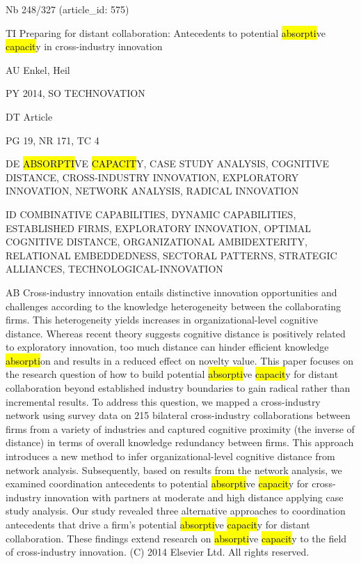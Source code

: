 \documentclass[a4paper]{article}
\begin{document}
\vspace*{-2cm}
Nb \tabto{0cm}248/327 (article\_id: 575)\par
TI \tabto{0cm}Preparing for distant collaboration: Antecedents to potential \hl{absorpti}ve \hl{capacit}y in cross-industry innovation\par
AU \tabto{0cm}Enkel, Heil\par
PY \tabto{0cm}2014, SO TECHNOVATION\par
DT \tabto{0cm}Article\par
PG \tabto{0cm}19, NR 171, TC 4\par
DE \tabto{0cm}\hl{ABSORPTI}VE \hl{CAPACIT}Y, CASE STUDY ANALYSIS, COGNITIVE DISTANCE, CROSS-INDUSTRY INNOVATION, EXPLORATORY INNOVATION, NETWORK ANALYSIS, RADICAL INNOVATION\par
ID \tabto{0cm}COMBINATIVE CAPABILITIES, DYNAMIC CAPABILITIES, ESTABLISHED FIRMS, EXPLORATORY INNOVATION, OPTIMAL COGNITIVE DISTANCE, ORGANIZATIONAL AMBIDEXTERITY, RELATIONAL EMBEDDEDNESS, SECTORAL PATTERNS, STRATEGIC ALLIANCES, TECHNOLOGICAL-INNOVATION\par
AB \tabto{0cm}Cross-industry innovation entails distinctive innovation opportunities and challenges according to the knowledge heterogeneity between the collaborating firms. This heterogeneity yields increases in organizational-level cognitive distance. Whereas recent theory suggests cognitive distance is positively related to exploratory innovation, too much distance can hinder efficient knowledge \hl{absorpti}on and results in a reduced effect on novelty value. This paper focuses on the research question of how to build potential \hl{absorpti}ve \hl{capacit}y for distant collaboration beyond established industry boundaries to gain radical rather than incremental results. To address this question, we mapped a cross-industry network using survey data on 215 bilateral cross-industry collaborations between firms from a variety of industries and captured cognitive proximity (the inverse of distance) in terms of overall knowledge redundancy between firms. This approach introduces a new method to infer organizational-level cognitive distance from network analysis. Subsequently, based on results from the network analysis, we examined coordination antecedents to potential \hl{absorpti}ve \hl{capacit}y for cross-industry innovation with partners at moderate and high distance applying case study analysis. Our study revealed three alternative approaches to coordination antecedents that drive a firm's potential \hl{absorpti}ve \hl{capacit}y for distant collaboration. These findings extend research on \hl{absorpti}ve \hl{capacit}y to the field of cross-industry innovation. (C) 2014 Elsevier Ltd. All rights reserved.\par
\clearpage
\end{document}
